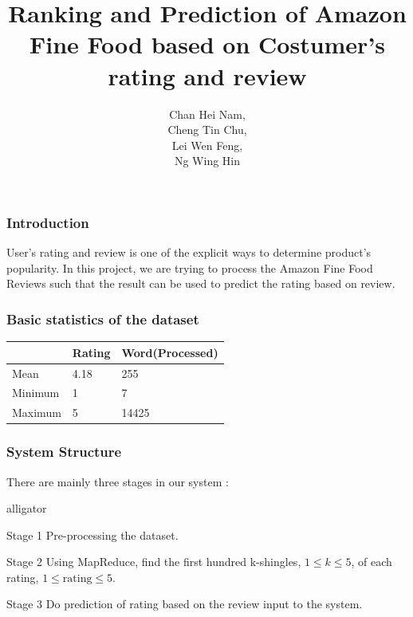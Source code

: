 \documentclass[11pt]{beamer}
\author{Chan Hei Nam, \\Cheng Tin Chu, \\Lei Wen Feng, \\Ng Wing Hin}
\title{Ranking and Prediction of Amazon Fine Food based on Costumer's rating and review}
\date{}
\begin{document}
\theoremstyle{plain}
\newtheorem{thm}{Theorem}[section] %

\theoremstyle{definition}
\newtheorem{defn}[thm]{Definition} %
\newtheorem{exmp}[thm]{Example} %
\newtheorem{prop}{Property}[section]

\graphicspath{ {images/} }

\begin{frame}
\titlepage
\end{frame}


\begin{frame}
\frametitle{Introduction}
User's rating and review is one of the explicit ways to determine product's popularity. In this project, we are trying to process the Amazon Fine Food Reviews such that the result can be used to predict the rating based on review.
\end{frame}

\begin{frame}
\frametitle{Basic statistics of the dataset}

\begin{tcolorbox}[colback=blue!5,colframe=blue!40!black,title=Basic statistics of the dataset]
\centering
\begin{tabular}{lll}
	\hline
	    					& Rating 	& Word(Processed)\\
	\hline
	Mean					& 4.18 		& 255\\
	Minimum       		& 1 			& 7\\
	Maximum       		& 5 			& 14425\\
	\hline
\end{tabular}
\end{tcolorbox}
\end{frame}


\begin{frame}
\frametitle{System Structure}
There are mainly three stages in our system :
\begin{labeling}{alligator}
\item [Stage 1] Pre-processing the dataset.
\item [Stage 2] Using MapReduce, find the first hundred k-shingles, \(1\leq k\leq 5\), of each rating, \(1 \leq \mbox{rating} \leq 5\).
\item [Stage 3] Do prediction of rating based on the review input to the system.
\end{labeling}
\end{frame}
\end{document}
